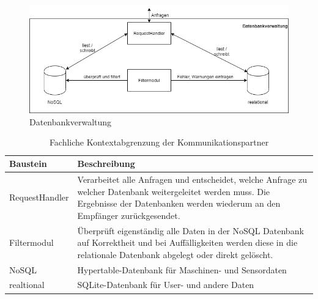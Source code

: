 \begin{figure}[h]
	\centering
	\includegraphics[width=1\textwidth]{Graphics/datenbankverwaltung.png}
	\caption{Datenbankverwaltung}
	\label{fig:datenbankverwaltung}
\end{figure}
	\begin{table}[th]
	\begin{tabularx}{\textwidth}{|p{5cm}| X|}
		\hline
		Baustein & Beschreibung\\
		\hline
		RequestHandler & Verarbeitet alle Anfragen und entscheidet, welche Anfrage zu welcher Datenbank weitergeleitet werden muss. Die Ergebnisse der Datenbanken werden wiederum an den Empfänger zurückgesendet. \\
		\hline
		Filtermodul & Überprüft eigenständig alle Daten in der NoSQL Datenbank auf Korrektheit und bei Auffälligkeiten werden diese in die relationale Datenbank abgelegt oder direkt gelöscht.\\
		\hline
		NoSQL & Hypertable-Datenbank für Maschinen- und Sensordaten\\
		\hline
		realtional & SQLite-Datenbank für User- und andere Daten\\
		\hline
	\end{tabularx} 
	\caption{Fachliche Kontextabgrenzung der Kommunikationspartner}
	\label{tab:FachlicheKontextabgrenzungDerKommunikationspartner}
\end{table}